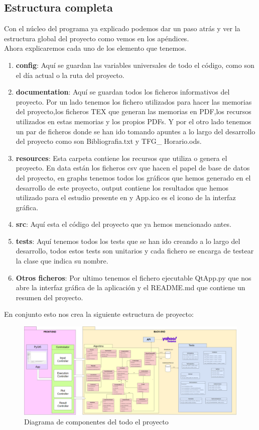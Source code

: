 \documentclass[12pt,a4paper]{article}
\begin{document}
	\subsection{Estructura completa}
	Con el núcleo del programa ya explicado podemos dar un paso atrás y ver la estructura global del proyecto como vemos en los apéndices.\\
	Ahora explicaremos cada uno de los elemento que tenemos.\\
	\begin{enumerate}
	\item \textbf{config}: Aquí se guardan las variables universales de todo el código, como son el día actual o la ruta del proyecto.
	\item \textbf{documentation}: Aquí se guardan todos los ficheros informativos del proyecto. Por un lado tenemos los fichero utilizados para hacer las memorias del proyecto,los ficheros TEX que generan las memorias en PDF,los recursos utilizados en estas memorias y los propios PDFs. Y por el otro lado tenemos un par de ficheros donde se han ido tomando apuntes a lo largo del desarrollo del proyecto como son Bibliografia.txt y TFG\_ Horario.ods.
	\item \textbf{resources}: Esta carpeta contiene los recursos que utiliza o genera el proyecto. En data están los ficheros csv que hacen el papel de base de datos del proyecto, en graphs tenemos todos los gráficos que hemos generado en el desarrollo de este proyecto, output contiene los resultados que hemos utilizado para el estudio presente en \cite{Princial} y App.ico es el icono de la interfaz gráfica.
	\item \textbf{src}: Aquí esta el código del proyecto que ya hemos mencionado antes.
	\item \textbf{tests}: Aquí tenemos todos los tests que se han ido creando a lo largo del desarrollo, todos estos tests son unitarios y cada fichero se encarga de testear la clase que indica su nombre.
	\item \textbf{Otros ficheros}: Por ultimo tenemos el fichero ejecutable QtApp.py que nos abre la interfaz gráfica de la aplicación y el README.md que contiene un resumen del proyecto.
	\end{enumerate}
	En conjunto esto nos crea la siguiente estructura de proyecto:\\
\begin{figure}[H]
\centering
  \centering
  \includegraphics[width=1\linewidth]{Diagrama proyecto completo}
\caption{Diagrama de componentes del todo el proyecto}
\label{fig:subrgrafo}
\end{figure}
\end{document}
